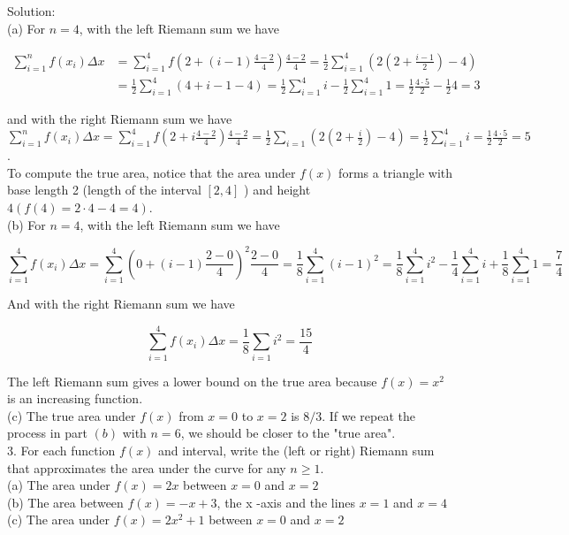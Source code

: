 \documentclass[10pt]{article}
\begin{document}
Solution:\\
(a) For $n=4$, with the left Riemann sum we have

$$
\begin{aligned}
\sum_{i=1}^{n} f\left(x_{i}\right) \Delta x & =\sum_{i=1}^{4} f\left(2+(i-1) \frac{4-2}{4}\right) \frac{4-2}{4}=\frac{1}{2} \sum_{i=1}^{4}\left(2\left(2+\frac{i-1}{2}\right)-4\right) \\
& =\frac{1}{2} \sum_{i=1}^{4}(4+i-1-4)=\frac{1}{2} \sum_{i=1}^{4} i-\frac{1}{2} \sum_{i=1}^{4} 1=\frac{1}{2} \frac{4 \cdot 5}{2}-\frac{1}{2} 4=3
\end{aligned}
$$

and with the right Riemann sum we have\\
$\sum_{i=1}^{n} f\left(x_{i}\right) \Delta x=\sum_{i=1}^{4} f\left(2+i \frac{4-2}{4}\right) \frac{4-2}{4}=\frac{1}{2} \sum_{i=1}\left(2\left(2+\frac{i}{2}\right)-4\right)=\frac{1}{2} \sum_{i=1}^{4} i=\frac{1}{2} \frac{4 \cdot 5}{2}=5$.\\
To compute the true area, notice that the area under $f(x)$ forms a triangle with base length 2 (length of the interval $[2,4]$ ) and height $4(f(4)=2 \cdot 4-4=4)$.\\
(b) For $n=4$, with the left Riemann sum we have

$$
\sum_{i=1}^{4} f\left(x_{i}\right) \Delta x=\sum_{i=1}^{4}\left(0+(i-1) \frac{2-0}{4}\right)^{2} \frac{2-0}{4}=\frac{1}{8} \sum_{i=1}^{4}(i-1)^{2}=\frac{1}{8} \sum_{i=1}^{4} i^{2}-\frac{1}{4} \sum_{i=1}^{4} i+\frac{1}{8} \sum_{i=1}^{4} 1=\frac{7}{4}
$$

And with the right Riemann sum we have

$$
\sum_{i=1}^{4} f\left(x_{i}\right) \Delta x=\frac{1}{8} \sum_{i=1} i^{2}=\frac{15}{4}
$$

The left Riemann sum gives a lower bound on the true area because $f(x)=x^{2}$ is an increasing function.\\
(c) The true area under $f(x)$ from $x=0$ to $x=2$ is $8 / 3$. If we repeat the process in part $(b)$ with $n=6$, we should be closer to the "true area".\\
3. For each function $f(x)$ and interval, write the (left or right) Riemann sum that approximates the area under the curve for any $n \geq 1$.\\
(a) The area under $f(x)=2 x$ between $x=0$ and $x=2$\\
(b) The area between $f(x)=-x+3$, the x -axis and the lines $x=1$ and $x=4$\\
(c) The area under $f(x)=2 x^{2}+1$ between $x=0$ and $x=2$
\end{document}
